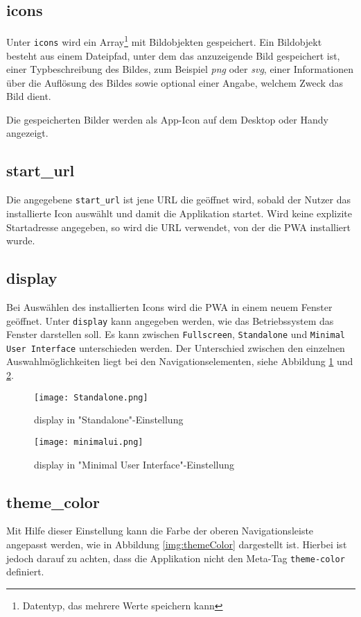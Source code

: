\subsection{icons}
Unter \texttt{icons} wird ein Array\footnote{Datentyp, das mehrere Werte speichern kann} mit Bildobjekten gespeichert. Ein Bildobjekt besteht aus einem Dateipfad, unter dem das anzuzeigende Bild gespeichert ist, einer Typbeschreibung des Bildes, zum Beispiel \textit{png} oder \textit{svg}, einer Informationen über die Auflösung des Bildes sowie optional einer Angabe, welchem Zweck das Bild dient. 

Die gespeicherten Bilder werden als App-Icon auf dem Desktop oder Handy angezeigt. 

\subsection{start\_url}
Die angegebene \texttt{start\_url} ist jene \ac{URL} die geöffnet wird, sobald der Nutzer das installierte Icon auswählt und damit die Applikation startet. 
Wird keine explizite Startadresse angegeben, so wird die URL verwendet, von der die PWA installiert wurde. 

\subsection{display}

Bei Auswählen des installierten Icons wird die PWA in einem neuem Fenster geöffnet. Unter \texttt{display} kann angegeben werden, wie das Betriebssystem das Fenster darstellen soll. 
Es kann zwischen \texttt{Fullscreen}, \texttt{Standalone} und \texttt{Minimal User Interface} unterschieden werden. 
Der Unterschied zwischen den einzelnen Auswahlmöglichkeiten liegt bei den Navigationselementen, siehe Abbildung \ref{img:Standalone} und \ref{img:minimalui}.

\begin{figure}[!htb]
    \texttt{[image: Standalone.png]}
    \caption{display in "Standalone"-Einstellung}
    \label{img:Standalone}
\end{figure}

\begin{figure}
    \texttt{[image: minimalui.png]}
    \caption{display in "Minimal User Interface"-Einstellung}
    \label{img:minimalui}
\end{figure}

\subsection{theme\_color}
Mit Hilfe dieser Einstellung kann die Farbe der oberen Navigationsleiste angepasst werden, wie in Abbildung \ref{img:themeColor} dargestellt ist. Hierbei ist jedoch darauf zu achten, dass die Applikation nicht den Meta-Tag \texttt{theme-color} definiert. 

